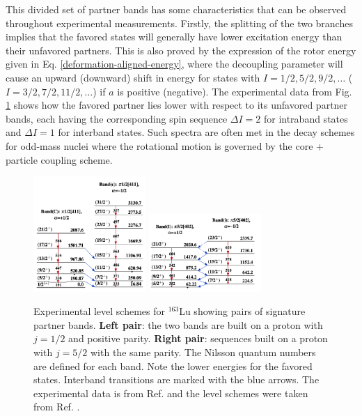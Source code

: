 This divided set of partner bands has some characteristics that can be observed throughout experimental measurements. Firstly, the splitting of the two branches implies that the favored states will generally have lower excitation energy than their unfavored partners. This is also proved by the expression of the rotor energy given in Eq. \ref{deformation-aligned-energy}, where the decoupling parameter will cause an upward (downward) shift in energy for states with $I=1/2,5/2,9/2,\dots$ ($I=3/2,7/2,11/2,\dots$) if $a$ is positive (negative). The experimental data from Fig. \ref{level-scheme-signature-splitting} shows how the favored partner lies lower with respect to its unfavored partner bands, each having the corresponding spin sequence $\Delta I=2$ for intraband states and $\Delta I=1$ for interband states. Such spectra are often met in the decay schemes for odd-mass nuclei where the rotational motion is governed by the core + particle coupling scheme.
\begin{figure}
    \centering
    \includegraphics[width=0.38\textwidth]{Chapters/Figures/Lu_163_K12-band.png}
    \includegraphics[width=0.38\textwidth]{Chapters/Figures/Lu_163_signatureSplitting.png}
    \caption{Experimental level schemes for $^{163}$Lu showing pairs of signature partner bands. \textbf{Left pair}: the two bands are built on a proton with $j=1/2$ and positive parity. \textbf{Right pair}: sequences built on a proton with $j=5/2$ with the same parity. The Nilsson quantum numbers are defined for each band. Note the lower energies for the favored states. Interband transitions are marked with the blue arrows. The experimental data is from Ref. \cite{reich2010nuclear} and the level schemes were taken from Ref. \cite{bhat1992evaluated}.}
    \label{level-scheme-signature-splitting}
\end{figure}
